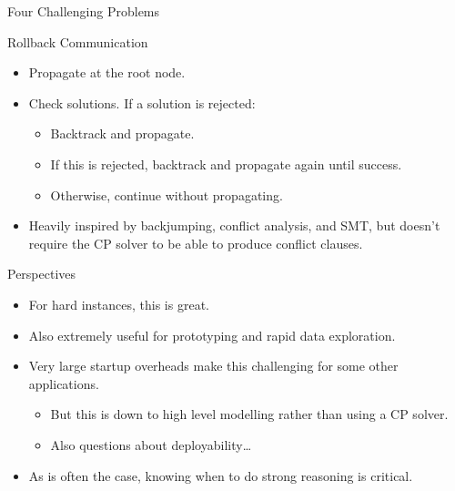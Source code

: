\documentclass{beamer}
\begin{document}
\begin{frame}{Four Challenging Problems}
\end{frame}

\begin{frame}{Rollback Communication}
    \begin{itemize}
        \item Propagate at the root node.
        \item Check solutions. If a solution is rejected:
            \begin{itemize}
                \item Backtrack and propagate.
                \item If this is rejected, backtrack and propagate again until success.
                \item Otherwise, continue without propagating.
            \end{itemize}
        \item Heavily inspired by backjumping, conflict analysis, and SMT, but doesn't require the CP
            solver to be able to produce conflict clauses.
    \end{itemize}
\end{frame}

\begin{frame}{Perspectives}
    \begin{itemize}
        \item For hard instances, this is great.
        \item Also extremely useful for prototyping and rapid data exploration.
        \item Very large startup overheads make this challenging for some other applications.
            \begin{itemize}
                \item But this is down to high level modelling rather than using a CP solver.
                \item Also questions about deployability\ldots
            \end{itemize}
        \item As is often the case, knowing when to do strong reasoning is critical.
    \end{itemize}
\end{frame}
\end{document}
